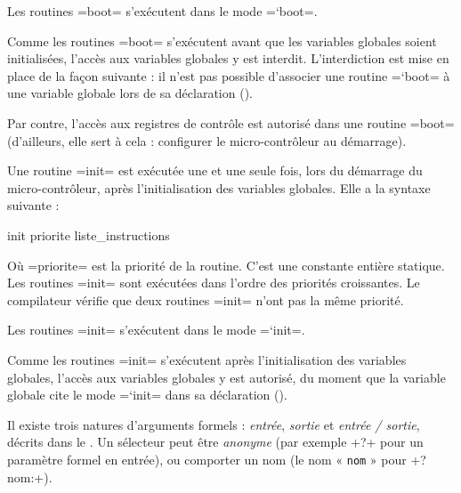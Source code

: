 Les routines \plm=boot= s'exécutent dans le mode \plm=`boot=.

Comme les routines \plm=boot= s'exécutent avant que les variables globales soient initialisées, l'accès aux variables globales y est interdit. L'interdiction est mise en place de la façon suivante : il n'est pas possible d'associer une routine \plm=`boot= à une variable globale lors de sa déclaration ().

Par contre, l'accès aux registres de contrôle est autorisé dans une routine \plm=boot= (d'ailleurs, elle sert à cela : configurer le micro-contrôleur au démarrage).








Une routine \plm=init= est exécutée une et une seule fois, lors du démarrage du micro-contrôleur, après l'initialisation des variables globales. Elle a la syntaxe suivante :
\begin{PLM}
init priorite {
  liste_instructions
}
\end{PLM}
Où \plm=priorite= est la priorité de la routine. C'est une constante entière statique. Les routines \plm=init= sont exécutées dans l'ordre des priorités croissantes. Le compilateur vérifie que deux routines \plm=init= n'ont pas la même priorité.

Les routines \plm=init= s'exécutent dans le mode \plm=`init=.

Comme les routines \plm=init= s'exécutent après l'initialisation des variables globales, l'accès aux variables globales y est autorisé, du moment que la variable globale cite le mode \plm=`init= dans sa déclaration ().







Il existe trois natures d'arguments formels : \emph{entrée}, \emph{sortie} et \emph{entrée / sortie}, décrits dans le . Un sélecteur peut être \emph{anonyme} (par exemple \plm+?+ pour un paramètre formel en entrée), ou comporter un nom (le nom « \texttt{nom} » pour \plm+?nom:+).

